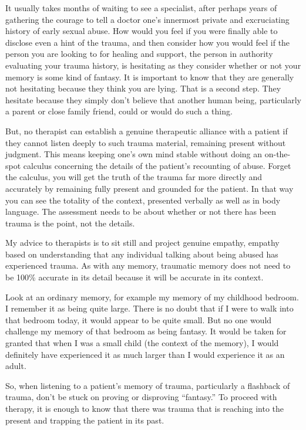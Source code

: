 \documentclass[]{book}
\begin{document}
It usually takes months of waiting to see a specialist, after perhaps years of gathering the courage to tell a doctor one's innermost private and excruciating history of early sexual abuse. How would you feel if you were finally able to disclose even a hint of the trauma, and then consider how you would feel if the person you are looking to for healing and support, the person in authority evaluating your trauma history, is hesitating as they consider whether or not your memory is some kind of fantasy. It is important to know that they are generally not hesitating because they think you are lying. That is a second step. They hesitate because they simply don't believe that another human being, particularly a parent or close family friend, could or would do such a thing.

But, no therapist can establish a genuine therapeutic alliance with a patient if they cannot listen deeply to such trauma material, remaining present without judgment. This means keeping one's own mind stable without doing an on-the-spot calculus concerning the details of the patient's recounting of abuse. Forget the calculus, you will get the truth of the trauma far more directly and accurately by remaining fully present and grounded for the patient. In that way you can see the totality of the context, presented verbally as well as in body language. The assessment needs to be about whether or not there has been trauma is the point, not the details.

My advice to therapists is to sit still and project genuine empathy, empathy based on understanding that any individual talking about being abused has experienced trauma. As with any memory, traumatic memory does not need to be 100\% accurate in its detail because it will be accurate in its context.

Look at an ordinary memory, for example my memory of my childhood bedroom. I remember it as being quite large. There is no doubt that if I were to walk into that bedroom today, it would appear to be quite small. But no one would challenge my memory of that bedroom as being fantasy. It would be taken for granted that when I was a small child (the context of the memory), I would definitely have experienced it as much larger than I would experience it as an adult.

So, when listening to a patient's memory of trauma, particularly a flashback of trauma, don't be stuck on proving or disproving ``fantasy.'' To proceed with therapy, it is enough to know that there was trauma that is reaching into the present and trapping the patient in its past.
\end{document}

